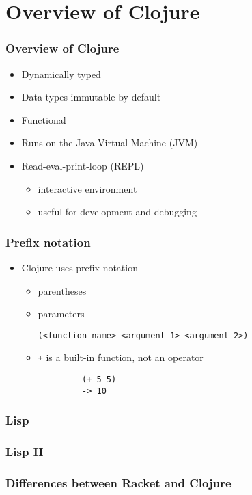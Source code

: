 \documentclass{beamer}
\begin{document}
\section{Overview of Clojure}

\begin{frame}
\frametitle{Overview of Clojure}
	\begin{itemize}
  	 \item Dynamically typed
  	 \item Data types immutable by default
  	 \item Functional
  	 \item Runs on the Java Virtual Machine (JVM)
  	 \item Read-eval-print-loop (REPL)
  	 	\begin{itemize}
  	 	\item interactive environment
  	 	\item useful for development and debugging
  	 	\end{itemize}
	 \end{itemize}
\end{frame}

\begin{frame}[fragile]
\frametitle{Prefix notation}
	\begin{itemize}
  	  \item Clojure uses prefix notation
  	  \begin{itemize}
  	 	 \item parentheses
  	 	 \item parameters
  	 	 
  	 	 \texttt{(<function-name> <argument 1> <argument 2>)}
  	 	 \item \texttt{+} is a built-in function, not an operator
  	 	 \begin{verbatim}		
		 (+ 5 5)
		 -> 10
	     \end{verbatim}
	  \end{itemize}
   \end{itemize}
\end{frame}

\begin{frame}
\frametitle{Lisp}
\end{frame}

\begin{frame}
\frametitle{Lisp II}
\end{frame}

\begin{frame}
\frametitle{Differences between Racket and Clojure}
\end{frame}
\end{document}
